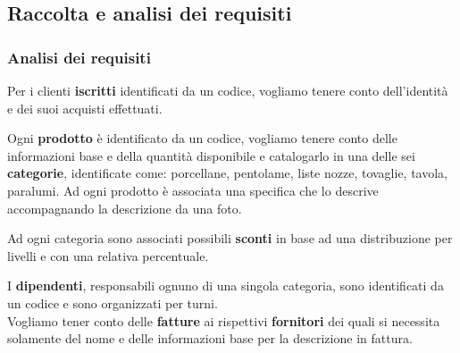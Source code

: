 \subsection{Raccolta e analisi dei requisiti}

\subsubsection{Analisi dei requisiti}
Per i clienti \textbf{iscritti} identificati da un codice, vogliamo tenere conto dell'identit\`a e dei suoi acquisti effettuati.



Ogni \textbf{prodotto} \`e identificato da un codice, vogliamo tenere conto delle informazioni base e della quantit\`a disponibile e catalogarlo in una delle sei \textbf{categorie}, identificate come: porcellane, pentolame, liste nozze, tovaglie, tavola, paralumi. Ad ogni prodotto \`e associata una specifica che lo descrive accompagnando la descrizione da una foto.


Ad ogni categoria sono associati possibili \textbf{sconti} in base ad una distribuzione per livelli e con una relativa percentuale.


I \textbf{dipendenti}, responsabili ognuno di una singola categoria, sono identificati da un codice e sono organizzati per turni. \\

Vogliamo tener conto delle \textbf{fatture} ai rispettivi \textbf{fornitori} dei quali si necessita solamente del nome e delle informazioni base per la descrizione in fattura.

